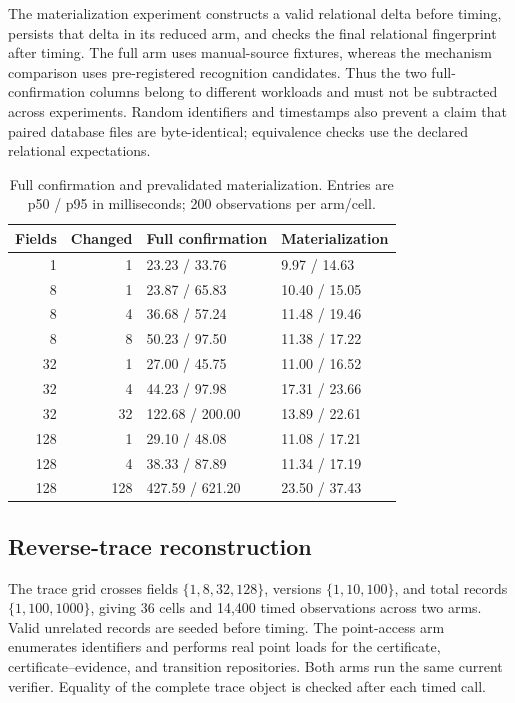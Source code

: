 \documentclass[11pt,a4paper]{article}
\begin{document}
The materialization experiment constructs a valid relational delta before timing, persists that delta in its reduced arm, and checks the final relational fingerprint after timing. The full arm uses manual-source fixtures, whereas the mechanism comparison uses pre-registered recognition candidates. Thus the two full-confirmation columns belong to different workloads and must not be subtracted across experiments. Random identifiers and timestamps also prevent a claim that paired database files are byte-identical; equivalence checks use the declared relational expectations.

\begin{table}[htbp]
\centering\small
\caption{Full confirmation and prevalidated materialization. Entries are p50 / p95 in milliseconds; 200 observations per arm/cell.}
\label{tab:s-ablation-grid}
\begin{tabular}{@{}rrll@{}}
\toprule
Fields & Changed & Full confirmation & Materialization \\
\midrule
1 & 1 & 23.23 / 33.76 & 9.97 / 14.63 \\
8 & 1 & 23.87 / 65.83 & 10.40 / 15.05 \\
8 & 4 & 36.68 / 57.24 & 11.48 / 19.46 \\
8 & 8 & 50.23 / 97.50 & 11.38 / 17.22 \\
32 & 1 & 27.00 / 45.75 & 11.00 / 16.52 \\
32 & 4 & 44.23 / 97.98 & 17.31 / 23.66 \\
32 & 32 & 122.68 / 200.00 & 13.89 / 22.61 \\
128 & 1 & 29.10 / 48.08 & 11.08 / 17.21 \\
128 & 4 & 38.33 / 87.89 & 11.34 / 17.19 \\
128 & 128 & 427.59 / 621.20 & 23.50 / 37.43 \\
\bottomrule\end{tabular}\end{table}


\subsection{Reverse-trace reconstruction}

The trace grid crosses fields $\{1,8,32,128\}$, versions $\{1,10,100\}$, and total records $\{1,100,1000\}$, giving 36 cells and 14,400 timed observations across two arms. Valid unrelated records are seeded before timing. The point-access arm enumerates identifiers and performs real point loads for the certificate, certificate--evidence, and transition repositories. Both arms run the same current verifier. Equality of the complete trace object is checked after each timed call.
\end{document}
